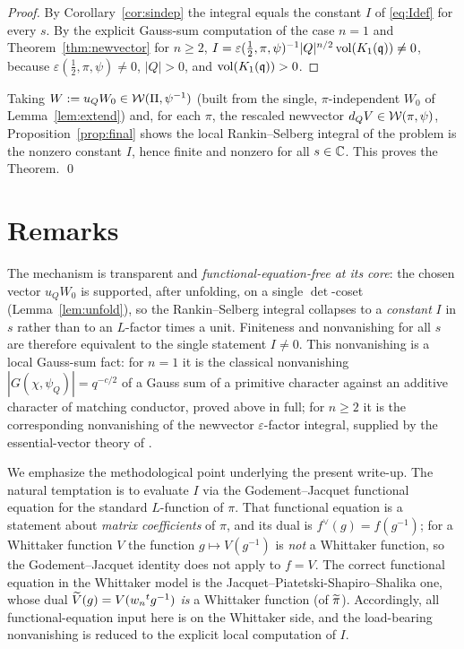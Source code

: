 \begin{proof}
By Corollary~\ref{cor:sindep} the integral equals the constant $I$ of \eqref{eq:Idef} for every
$s$. By the explicit Gauss-sum computation of the case $n=1$ and Theorem~\ref{thm:newvector} for
$n\ge2$, $I=\varepsilon(\tfrac12,\pi,\psi)^{-1}|Q|^{n/2}\operatorname{vol}(K_1(\mathfrak{q}))\neq0$, because
$\varepsilon(\tfrac12,\pi,\psi)\neq0$, $|Q|>0$, and $\operatorname{vol}(K_1(\mathfrak{q}))>0$.
\end{proof}

Taking $W:=u_Q W_0\in\mathcal{W}(\Pi,\psi^{-1})$ \textup{(}built from the single, $\pi$-independent
$W_0$ of Lemma~\ref{lem:extend}\textup{)} and, for each $\pi$, the rescaled newvector $d_Q V\in
\mathcal{W}(\pi,\psi)$, Proposition~\ref{prop:final} shows the local Rankin--Selberg integral of the
problem is the nonzero constant $I$, hence finite and nonzero for all $s\in\mathbb{C}$. This proves
the Theorem. \qed

\section*{Remarks}

The mechanism is transparent and \emph{functional-equation-free at its core}: the chosen vector
$u_Q W_0$ is supported, after unfolding, on a single $\det$-coset
\textup{(}Lemma~\ref{lem:unfold}\textup{)}, so the Rankin--Selberg integral collapses to a
\emph{constant} $I$ in $s$ rather than to an $L$-factor times a unit. Finiteness and nonvanishing
for all $s$ are therefore equivalent to the single statement $I\neq0$. This nonvanishing is a
local Gauss-sum fact: for $n=1$ it is the classical nonvanishing $|G(\chi,\psi_Q)|=q^{-c/2}$ of a
Gauss sum of a primitive character against an additive character of matching conductor, proved
above in full; for $n\ge2$ it is the corresponding nonvanishing of the newvector
$\varepsilon$-factor integral, supplied by the essential-vector theory of \cite{JPSS81,Matringe}.

We emphasize the methodological point underlying the present write-up. The natural temptation is
to evaluate $I$ via the Godement--Jacquet functional equation for the standard $L$-function of
$\pi$. That functional equation is a statement about \emph{matrix coefficients} of $\pi$, and its
dual is $f^\vee(g)=f(g^{-1})$; for a Whittaker function $V$ the function $g\mapsto V(g^{-1})$ is
\emph{not} a Whittaker function, so the Godement--Jacquet identity does not apply to $f=V$. The
correct functional equation in the Whittaker model is the Jacquet--Piatetski-Shapiro--Shalika one,
whose dual $\widetilde{V}(g)=V(w_n{}^{t}g^{-1})$ \emph{is} a Whittaker function \textup{(}of
$\widetilde{\pi}$\textup{)}. Accordingly, all functional-equation input here is on the Whittaker
side, and the load-bearing nonvanishing is reduced to the explicit local computation of $I$.

